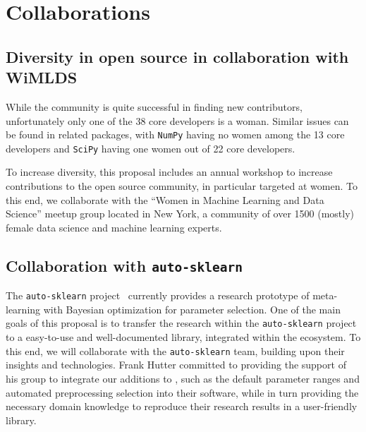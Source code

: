 \section{Collaborations}
\subsection{Diversity in open source in collaboration with WiMLDS}
While the \sklearn{} community is quite successful in finding new contributors,
unfortunately only one of the 38 \sklearn{} core developers is a woman.
Similar issues can be found in related packages, with \texttt{NumPy} having no
women among the 13 core developers and \texttt{SciPy} having one women out of
22 core developers.

To increase diversity, this proposal includes an annual workshop to increase
contributions to the open source community, in particular targeted at women.
To this end, we collaborate with the ``Women in Machine Learning and Data Science''
meetup group located in New York, a community of over 1500 (mostly) female data science and
machine learning experts.

\subsection{Collaboration with \texttt{auto-sklearn}}
The \texttt{auto-sklearn} project~\autocite{feurer-nips2015} currently provides
a research prototype of meta-learning with Bayesian optimization for parameter
selection. One of the main goals of this proposal is to transfer the research
within the \texttt{auto-sklearn} project to a easy-to-use and well-documented
library, integrated within the \sklearn{} ecosystem. To this end, we will
collaborate with the \texttt{auto-sklearn} team, building upon their insights
and technologies. Frank Hutter committed to providing the support of his group
to integrate our additions to \sklearn{}, such as the default parameter ranges
and automated preprocessing selection into their software, while in turn
providing the necessary domain knowledge to reproduce their research results in
a user-friendly library.

